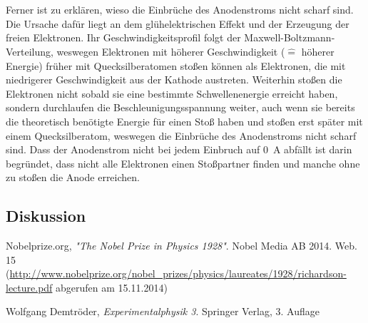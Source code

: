 \documentclass[11pt, a4paper]{article}
\begin{document}
\\
\\
Ferner ist zu erklären, wieso die Einbrüche des Anodenstroms nicht scharf sind.
Die Ursache dafür liegt an dem glühelektrischen Effekt und der Erzeugung der freien Elektronen.
Ihr Geschwindigkeitsprofil folgt der Maxwell-Boltzmann-Verteilung, weswegen Elektronen mit höherer Geschwindigkeit ($\widehat{=}$ höherer Energie) früher mit Quecksilberatomen stoßen können als Elektronen, die mit niedrigerer Geschwindigkeit aus der Kathode austreten.
Weiterhin stoßen die Elektronen nicht sobald sie eine bestimmte Schwellenenergie erreicht haben, sondern durchlaufen die Beschleunigungsspannung weiter, auch wenn sie bereits die theoretisch benötigte Energie für einen Stoß haben und stoßen erst später mit einem Quecksilberatom, weswegen die Einbrüche des Anodenstroms nicht scharf sind.
Dass der Anodenstrom nicht bei jedem Einbruch auf \SI{0}{\ampere} abfällt ist darin begründet, dass nicht alle Elektronen einen Stoßpartner finden und manche ohne zu stoßen die Anode erreichen. 

\subsection{Diskussion}

\FloatBarrier


\begin{thebibliography}{9}

 Nobelprize.org,
 \emph{"The Nobel Prize in Physics 1928"}.
 Nobel Media AB 2014. Web. 15\\
 (\url{http://www.nobelprize.org/nobel_prizes/physics/laureates/1928/richardson-lecture.pdf} abgerufen am 15.11.2014)
  
	Wolfgang Demtröder,
	\emph{Experimentalphysik 3}.
	Springer Verlag,
	3. Auflage
\end{thebibliography}

\newpage
\end{document}
